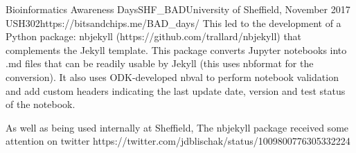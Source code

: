 \begin{event}{Bioinformatics Awareness Days}{SHF_BAD}{University of Sheffield, November 2017 }{USH}{30}{2}{https://bitsandchips.me/BAD_days/}
This led to the development of a Python package: nbjekyll (https://github.com/trallard/nbjekyll) that complements the Jekyll template. This package converts Jupyter notebooks into .md files that can be readily usable by Jekyll (this uses nbformat for the conversion). It also uses ODK-developed nbval to perform notebook validation and add custom headers indicating the last update date, version and test status of the notebook.

As well as being used internally at Sheffield, The nbjekyll package received some attention on twitter https://twitter.com/jdblischak/status/1009800776305332224

\end{event}
